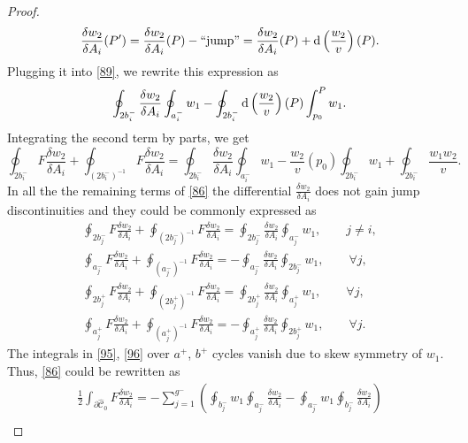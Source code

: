 \documentclass[pdftex]{sigma}
\numberwithin{equation}{section}
\theoremstyle{definition}
\begin{document}
\begin{proof}
\begin{equation*}
\frac{\delta w_2}{\delta A_i}(P')=\frac{\delta w_2}{\delta A_i}(P)-\text{``jump''}=\frac{\delta w_2}{\delta A_i}(P)+{\rm d}\left(\frac{w_2}{v}\right)(P).\end{equation*}
Plugging it into \eqref{89}, we rewrite this expression as
 \begin{equation*}%
 \oint_{ 2b^-_i}\frac{\delta w_2}{\delta A_i}\oint_{a^-_i}w_1-\oint_{ 2b^-_i}{\rm d}\left(\frac{w_2}{v}\right)(P)\int^{P}_{p_0}w_1.
 \end{equation*}
Integrating the second term by parts, we get
 \begin{equation*}%
 \oint_{ 2b^-_i}F \frac{\delta w_2}{\delta A_i}+\oint_{( 2b^-_i)^{-1}}F \frac{\delta w_2}{\delta A_i}=\oint_{ 2b^-_i}\frac{\delta w_2}{\delta A_i}\oint_{a^-_i}w_1-\frac{w_2}{v}(p_0)\oint_{ 2b^-_i}w_1+\oint_{ 2b^-_i}\frac{w_1 w_2}{v}.
 \end{equation*}
In all the the remaining terms of \eqref{86} the differential $\frac{\delta w_2}{\delta A_i}$ does not gain jump discontinuities and they could be commonly expressed as
\begin{gather}%
\oint_{ 2b^-_j}F \frac{\delta w_2}{\delta A_i}+\oint_{( 2b^-_j)^{-1}}F \frac{\delta w_2}{\delta A_i}=\oint_{ 2b^-_j}\frac{\delta w_2}{\delta A_i}\oint_{a^-_j}w_1, \qquad j \neq i, \nonumber\\
\oint_{ a^-_j}F \frac{\delta w_2}{\delta A_i}+\oint_{( a^-_j)^{-1}}F \frac{\delta w_2}{\delta A_i}=-\oint_{ a^-_j}\frac{\delta w_2}{\delta A_i}\oint_{2b^-_j}w_1, \qquad \forall j, \nonumber\\
 \label{95}\oint_{ 2b^+_j}F \frac{\delta w_2}{\delta A_i}+\oint_{( 2b^+_j)^{-1}}F \frac{\delta w_2}{\delta A_i}=\oint_{ 2b^+_j}\frac{\delta w_2}{\delta A_i}\oint_{a^+_j}w_1, \qquad \forall j, \\
\label{96}\oint_{ a^+_j}F \frac{\delta w_2}{\delta A_i}+\oint_{( a^+_j)^{-1}}F \frac{\delta w_2}{\delta A_i}=-\oint_{ a^+_j}\frac{\delta w_2}{\delta A_i}\oint_{2b^+_j}w_1, \qquad \forall j. \end{gather}
The integrals in \eqref{95}, \eqref{96} over $a^+$, $b^+$ cycles vanish due to skew symmetry of $w_1$.
Thus, \eqref{86} could be rewritten as
\begin{gather}
\frac{1}{2}\int_{\partial \hat{\mathcal{C}}_0}F\frac{\delta w_2}{\delta A_i}=-\sum^{g^-}_{j=1}\left(\oint_{b^-_j} w_1
\oint_{a^-_j}\frac{\delta w_2}{\delta A_i}-\oint_{a^-_j} w_1
 \oint_{b^-_j}\frac{\delta w_2}{\delta A_i}\right)\nonumber\\

\end{gather}
\end{proof}
\end{document}
